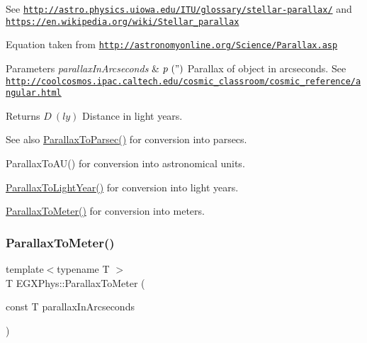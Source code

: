 See \href{http://astro.physics.uiowa.edu/ITU/glossary/stellar-parallax/}{\tt http\+://astro.\+physics.\+uiowa.\+edu/\+I\+T\+U/glossary/stellar-\/parallax/} and \href{https://en.wikipedia.org/wiki/Stellar_parallax}{\tt https\+://en.\+wikipedia.\+org/wiki/\+Stellar\+\_\+parallax}

Equation taken from \href{http://astronomyonline.org/Science/Parallax.asp}{\tt http\+://astronomyonline.\+org/\+Science/\+Parallax.\+asp}


\begin{DoxyParams}{Parameters}
{\em parallax\+In\+Arcseconds} & $ p\ (")$ Parallax of object in arcseconds. See \href{http://coolcosmos.ipac.caltech.edu/cosmic_classroom/cosmic_reference/angular.html}{\tt http\+://coolcosmos.\+ipac.\+caltech.\+edu/cosmic\+\_\+classroom/cosmic\+\_\+reference/angular.\+html} \\
\hline
\end{DoxyParams}
\begin{DoxyReturn}{Returns}
$ D\ (ly)$ Distance in light years. 
\end{DoxyReturn}
\begin{DoxySeeAlso}{See also}
\mbox{\hyperlink{group___e_g_x_phys-_astrophysic-_parallax_gab42dbec142e1a47925fc45e899845861}{Parallax\+To\+Parsec()}} for conversion into parsecs. 

Parallax\+To\+A\+U() for conversion into astronomical units. 

\mbox{\hyperlink{group___e_g_x_phys-_astrophysic-_parallax_gacaec31498f264e2a1dc285062a394de2}{Parallax\+To\+Light\+Year()}} for conversion into light years. 

\mbox{\hyperlink{group___e_g_x_phys-_astrophysic-_parallax_ga94912bf8b98a04cccab8ef19eaa89b6a}{Parallax\+To\+Meter()}} for conversion into meters. 
\end{DoxySeeAlso}
\mbox{\label{group___e_g_x_phys-_astrophysic-_parallax_ga94912bf8b98a04cccab8ef19eaa89b6a}} 
\subsubsection{\texorpdfstring{Parallax\+To\+Meter()}{ParallaxToMeter()}}
{\footnotesize\ttfamily template$<$typename T $>$ \\
T E\+G\+X\+Phys\+::\+Parallax\+To\+Meter (\begin{DoxyParamCaption}\item[{const T}]{parallax\+In\+Arcseconds }\end{DoxyParamCaption})}



